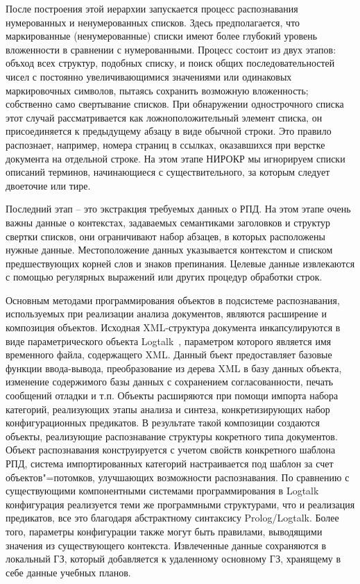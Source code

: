 \documentclass[
]{aiitart}
\begin{document}
После построения этой иерархии запускается процесс распознавания нумерованных и ненумерованных списков. Здесь предполагается, что маркированные (ненумерованные) списки имеют более глубокий уровень вложенности в сравнении с нумерованными. Процесс состоит из двух этапов: объход всех структур, подобных списку, и поиск общих последовательностей чисел с постоянно увеличивающимися значениями или одинаковых маркировочных символов, пытаясь сохранить возможную вложенность; собственно само свертывание списков. При обнаружении однострочного списка этот случай рассматривается как ложноположительный элемент списка, он присоединяется к предыдущему абзацу в виде обычной строки. Это правило распознает, например, номера страниц в ссылках, оказавшихся при верстке документа на отдельной строке. На этом этапе НИРОКР мы игнорируем списки описаний терминов, начинающиеся с существительного, за которым следует двоеточие или тире.

Последний этап -- это экстракция требуемых данных о РПД. На этом этапе очень важны данные о контекстах, задаваемых семантиками заголовков и структур свертки списков, они ограничивают набор абзацев, в которых расположены нужные данные. Местоположение данных указывается контекстом и списком предшествующих корней слов и знаков препинания. Целевые данные извлекаются с помощью регулярных выражений или других процедур обработки строк.

Основным методами программирования объектов в подсистеме распознавания, используемых при реализации анализа документов, являются расширение и композиция объектов. Исходная XML-структура документа инкапсулируются в виде параметрического объекта Logtalk~\cite{logtalk}, параметром которого является имя временного файла, содержащего XML. Данный бъект предоставляет базовые функции ввода-вывода, преобразование из дерева XML в базу данных объекта, изменение содержимого базы данных с сохранением согласованности, печать сообщений отладки и т.п. Объекты расширяются при помощи импорта набора категорий, реализующих этапы анализа и синтеза, конкретизирующих набор конфигурационных предикатов.  В результате такой композиции создаются объекты, реализующие распознавание структуры кокретного типа документов. Объект распознавания конструируется с учетом свойств конкретного шаблона РПД, система импортированных категорий настраивается под шаблон за счет объектов"=потомков, улучшающих возможности распознавания. По сравнению с существующими компонентными системами программирования в Logtalk конфигурация реализуется теми же программными структурами, что и реализация предикатов, все это благодаря абстрактному синтаксису Prolog/Logtalk.  Более того, параметры конфигурации также могут быть правилами, выводящими значения из существующего контекста. Извлеченные данные сохраняются в локальный ГЗ, который добавляется к удаленному основному ГЗ, хранящему в себе данные учебных планов.
\end{document}
